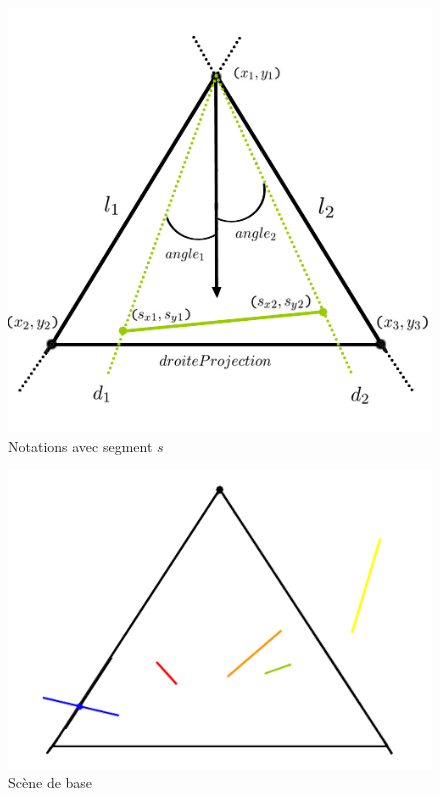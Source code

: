\documentclass[11pt,a4paper]{article}
\theoremstyle{definition}
\theoremstyle{remark}
\begin{document}
\begin{figure}[!h]
\centering
\includegraphics[scale=0.4]{painter_notations_2.png}
\caption{Notations avec segment $s$}
\label{exp_1}
\end{figure}
\newline
\begin{figure}[!h]
\centering
\includegraphics[scale=0.4]{base.png}
\caption{Scène de base}
\label{exp_2}
\end{figure}

\newpage
\end{document}

